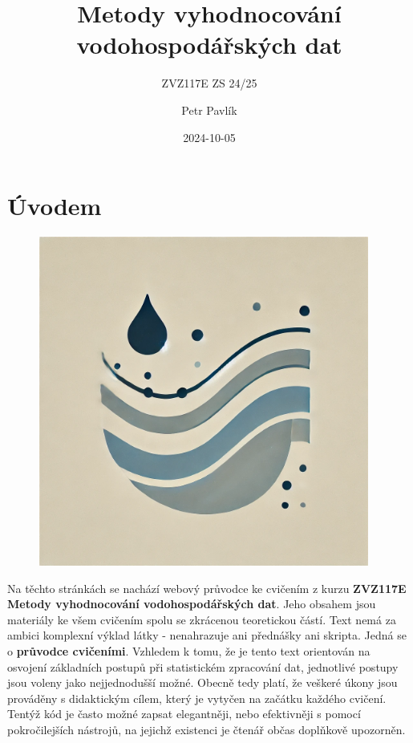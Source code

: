 \documentclass[
  letterpaper,
  DIV=11,
  numbers=noendperiod]{scrreprt}
\title{Metody vyhodnocování vodohospodářských dat}
\subtitle{ZVZ117E ZS 24/25}
\author{Petr Pavlík}
\date{2024-10-05}
\renewcommand*\contentsname{Obsah}
\newcommand\contentsname{Obsah}
\begin{document}
\maketitle
\ifdefined\Shaded\renewenvironment{Shaded}{\begin{tcolorbox}[interior hidden, sharp corners, borderline west={3pt}{0pt}{shadecolor}, frame hidden, enhanced, breakable, boxrule=0pt]}{\end{tcolorbox}}\fi

\renewcommand*\contentsname{Obsah}
{
\hypersetup{linkcolor=}
\setcounter{tocdepth}{2}
\tableofcontents
}

\hypertarget{uxfavodem}{%
\chapter{Úvodem}\label{uxfavodem}}

\begin{figure}

{\centering \includegraphics[width=4.27083in,height=\textheight]{images/logo_mvvd.webp}

}

\end{figure}

Na těchto stránkách se nachází webový průvodce ke cvičením z kurzu
\textbf{ZVZ117E Metody vyhodnocování vodohospodářských dat}. Jeho
obsahem jsou materiály ke všem cvičením spolu se zkrácenou teoretickou
částí. Text nemá za ambici komplexní výklad látky - nenahrazuje ani
přednášky ani skripta. Jedná se o \textbf{průvodce cvičeními}. Vzhledem
k tomu, že je tento text orientován na osvojení základních postupů při
statistickém zpracování dat, jednotlivé postupy jsou voleny jako
nejjednodušší možné. Obecně tedy platí, že veškeré úkony jsou prováděny
s didaktickým cílem, který je vytyčen na začátku každého cvičení. Tentýž
kód je často možné zapsat elegantněji, nebo efektivněji s pomocí
pokročilejších nástrojů, na jejichž existenci je čtenář občas doplňkově
upozorněn.
\end{document}
